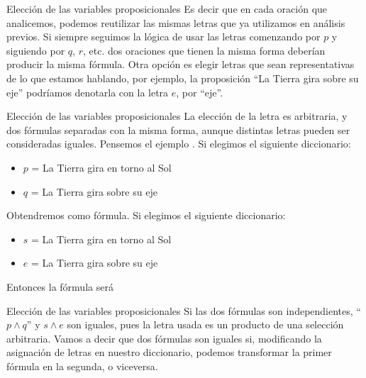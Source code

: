 
\begin{frame}{Elección de las variables proposicionales}
  Es decir que en cada oración que analicemos, podemos reutilizar las mismas
  letras que ya utilizamos en análisis previos.
  \jump
  Si siempre seguimos la lógica de usar las letras comenzando por $p$ y
  siguiendo por $q$, $r$, etc. dos oraciones que tienen la misma forma
  deberían producir la misma fórmula.
  \jump
  Otra opción es elegir letras que sean representativas de lo que estamos
  hablando, por ejemplo, la proposición ``La Tierra gira sobre su eje'' podríamos
  denotarla con la letra $e$, por ``eje''.
\end{frame}


\begin{frame}{Elección de las variables proposicionales}
  La elección de la letra es arbitraria, y dos fórmulas separadas con la misma
  forma, aunque distintas letras pueden ser consideradas iguales.
  \jump
  Pensemos el ejemplo .
  Si elegimos el siguiente diccionario:
  \begin{itemize}
    \item $p$ = La Tierra gira en torno al Sol
    \item $q$ = La Tierra gira sobre su eje
  \end{itemize}
  Obtendremos  como fórmula.
  \jump
  Si elegimos el siguiente diccionario:
  \begin{itemize}
    \item $s$ = La Tierra gira en torno al Sol
    \item $e$ = La Tierra gira sobre su eje
  \end{itemize}
  Entonces la fórmula será 
\end{frame}


\begin{frame}{Elección de las variables proposicionales}
  Si las dos fórmulas son independientes, ``$p \land q$'' y $s \land e$ son
  iguales, pues la letra usada es un producto de una selección arbitraria.
  \jump
  Vamos a decir que dos fórmulas son iguales si, modificando la asignación de
  letras en nuestro diccionario, podemos transformar la primer fórmula en la
  segunda, o viceversa.
\end{frame}

